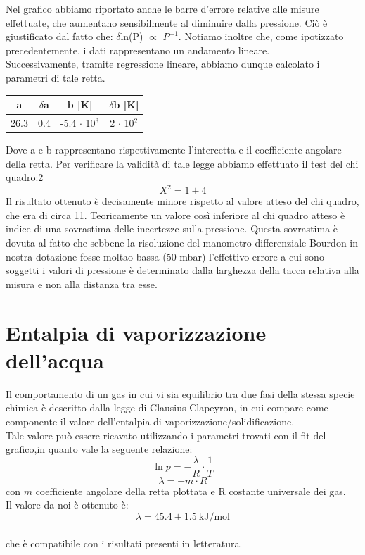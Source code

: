 \documentclass[11pt]{article}
\begin{document}
Nel grafico abbiamo riportato anche le barre d'errore relative alle misure effettuate, che aumentano sensibilmente al diminuire dalla pressione. Ciò è giustificato dal fatto che: $\delta$ln(P) $\propto$ $P^{-1}$. Notiamo inoltre che, come ipotizzato precedentemente, i dati rappresentano un andamento lineare.\\
Successivamente, tramite regressione lineare, abbiamo dunque calcolato i parametri di tale retta. 
\begin{center}
\begin{tabular}{|c|c|c|c|}
\hline
a & $\delta$a & b [\unit{K}] & $\delta$b [\unit{K}]\\
\hline
 26.3 & 0.4 & -5.4 $\cdot$ 10$^{3}$ & 2 $\cdot$ 10$^{2}$ \\
\hline
\end{tabular}
\end{center}
Dove a e b rappresentano rispettivamente l'intercetta e il coefficiente angolare della retta. Per verificare la validità di tale legge abbiamo effettuato il test del chi quadro:2
\begin{equation}
X^2 = 1 \pm 4
\end{equation}
Il risultato ottenuto è decisamente minore rispetto al valore atteso del chi quadro, che era di circa 11. Teoricamente un valore così inferiore al chi quadro atteso è indice di una sovrastima delle incertezze sulla pressione. Questa sovrastima è dovuta al fatto che sebbene la risoluzione del manometro differenziale Bourdon in  nostra dotazione fosse moltao bassa (50 \unit{mbar}) l'effettivo errore a cui sono soggetti i valori di pressione è determinato dalla larghezza della tacca relativa alla misura e non alla distanza tra esse.

\section{Entalpia di vaporizzazione dell'acqua}
Il comportamento di un gas in cui vi sia equilibrio tra due fasi della stessa specie chimica è descritto dalla legge di Clausius-Clapeyron, in cui compare come componente il valore dell'entalpia di vaporizzazione/solidificazione. 
\\
Tale valore può essere ricavato utilizzando i parametri trovati con il fit del grafico,in quanto vale la seguente relazione:
$$\ln{p}= -\frac{\lambda}{R}\cdot\frac{1}{T}$$
$$\lambda =-m \cdot R$$
con $m$ coefficiente angolare della retta plottata e R costante universale dei gas. \\
Il valore da noi è ottenuto è:
$$\lambda = 45.4 \pm 1.5 ~\text{kJ}/\text{mol}$$   
\\che è compatibile con i risultati presenti in letteratura. 
\end{document}
